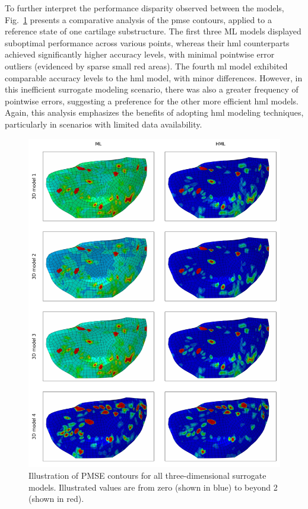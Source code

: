 \documentclass[12pt,a4paper]{report}
\begin{document}
To further interpret the performance disparity observed between the models, Fig.~\ref{fig:visualization} presents a comparative analysis of the \ac{pmse} contours, applied to a reference state of one cartilage substructure. The first three ML models displayed suboptimal performance across various points, whereas their \ac{hml} counterparts achieved significantly higher accuracy levels, with minimal pointwise error outliers (evidenced by sparse small red areas). The fourth \ac{ml} model exhibited comparable accuracy levels to the \ac{hml} model, with minor differences. However, in this inefficient surrogate modeling scenario, there was also a greater frequency of pointwise errors, suggesting a preference for the other more efficient \ac{hml} models. Again, this analysis emphasizes the benefits of adopting \ac{hml} modeling techniques, particularly in scenarios with limited data availability.
%
\begin{figure}\centering
\includegraphics[height=0.9\textheight]{visualization_3d.jpg}
\caption{Illustration of PMSE contours for all three-dimensional surrogate models. Illustrated values are from zero (shown in blue) to beyond 2 (shown in red).}\label{fig:visualization}
\end{figure}
\end{document}
